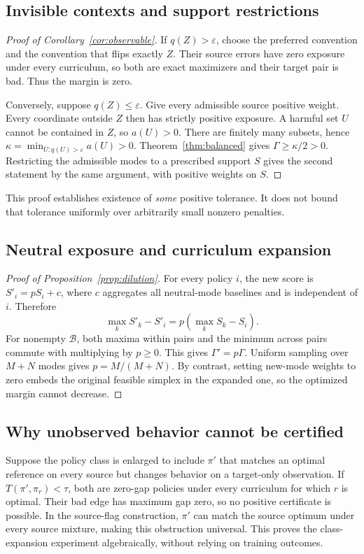 \documentclass[11pt]{article}
\theoremstyle{definition}\newtheorem{definition}[theorem]{Definition}
\newcommand{\1}{\mathbf{1}}
\newcommand{\bad}{\mathcal B}
\newcommand{\Gam}{\Gamma}
\newcommand{\eps}{\varepsilon}
\begin{document}
\subsection{Invisible contexts and support restrictions}
\begin{proof}[Proof of Corollary~\ref{cor:observable}]
If $q(Z)>\eps$, choose the preferred convention and the convention that flips exactly $Z$. Their source errors have zero exposure under every curriculum, so both are exact maximizers and their target pair is bad. Thus the margin is zero.

Conversely, suppose $q(Z)\leq\eps$. Give every admissible source positive weight. Every coordinate outside $Z$ then has strictly positive exposure. A harmful set $U$ cannot be contained in $Z$, so $a(U)>0$. There are finitely many subsets, hence $\kappa=\min_{U:q(U)>\eps}a(U)>0$. Theorem~\ref{thm:balanced} gives $\Gam\geq\kappa/2>0$. Restricting the admissible modes to a prescribed support $S$ gives the second statement by the same argument, with positive weights on $S$.
\end{proof}
This proof establishes existence of \emph{some} positive tolerance. It does not bound that tolerance uniformly over arbitrarily small nonzero penalties.

\subsection{Neutral exposure and curriculum expansion}
\begin{proof}[Proof of Proposition~\ref{prop:dilution}]
For every policy $i$, the new score is $S'_i=pS_i+c$, where $c$ aggregates all neutral-mode baselines and is independent of $i$. Therefore
\begin{equation*}
 \max_kS'_k-S'_i=p(\max_kS_k-S_i).
\end{equation*}
For nonempty $\bad$, both maxima within pairs and the minimum across pairs commute with multiplying by $p\geq0$. This gives $\Gam'=p\Gam$. Uniform sampling over $M+N$ modes gives $p=M/(M+N)$. By contrast, setting new-mode weights to zero embeds the original feasible simplex in the expanded one, so the optimized margin cannot decrease.
\end{proof}

\subsection{Why unobserved behavior cannot be certified}
Suppose the policy class is enlarged to include $\pi'$ that matches an optimal reference on every source but changes behavior on a target-only observation. If $T(\pi',\pi_r)<\tau$, both are zero-gap policies under every curriculum for which $r$ is optimal. Their bad edge has maximum gap zero, so no positive certificate is possible. In the source-flag construction, $\pi'$ can match the source optimum under every source mixture, making this obstruction universal. This proves the class-expansion experiment algebraically, without relying on training outcomes.
\end{document}
